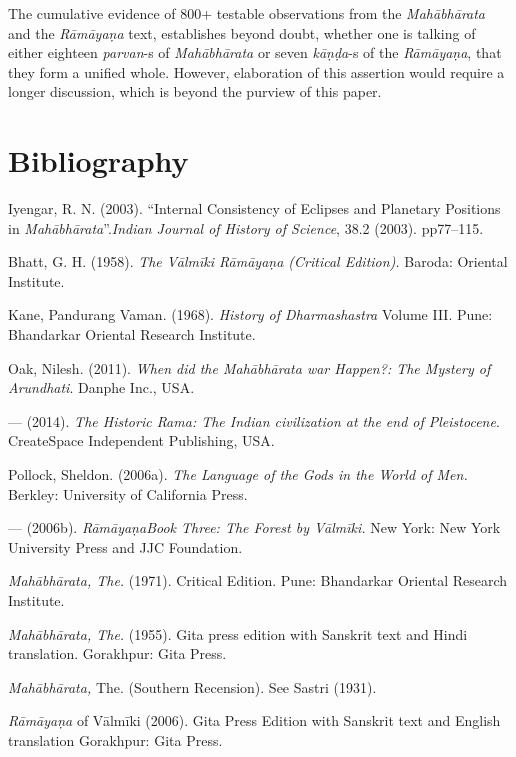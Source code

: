 The cumulative evidence of 800+ testable observations from the \textit{Mahābhārata} and the \textit{Rāmāyaṇa} text, establishes beyond doubt, whether one is talking of either eighteen \textit{parvan}-s of \textit{Mahābhārata} or seven \textit{kāṇḍa}-s of the \textit{Rāmāyaṇa}, that they form a unified whole. However, elaboration of this assertion would require a longer discussion, which is beyond the purview of this paper.


\section*{Bibliography}

\begin{thebibliography}{99}
\itemsep=1pt
 Iyengar, R. N. (2003). “Internal Consistency of Eclipses and Planetary Positions in \textit{Mahābhārata}”.\textit{Indian Journal of History of Science}, 38.2 (2003). pp77--115.

  Bhatt, G. H. (1958). \textit{The Vālmīki Rāmāyaṇa (Critical Edition).} Baroda: Oriental Institute.

  Kane, Pandurang Vaman. (1968). \textit{History of Dharmashastra} Volume III. Pune: Bhandarkar Oriental Research Institute.

  Oak, Nilesh. (2011). \textit{When did the Mahābhārata war Happen?: The Mystery of Arundhati}. Danphe Inc., USA.

  — (2014). \textit{The Historic Rama: The Indian civilization at the end of Pleistocene}. CreateSpace Independent Publishing, USA.

  Pollock, Sheldon. (2006a). \textit{The Language of the Gods in the World of Men.} Berkley: University of California Press.

  — (2006b). \textit{Rāmāyaṇa}\textit{Book Three: The Forest by Vālmīki.} New York: New York University Press and JJC Foundation.

  \textit{Mahābhārata, The.} (1971). Critical Edition. Pune: Bhandarkar Oriental Research Institute.

  \textit{Mahābhārata, The.} (1955). Gita press edition with Sanskrit text and Hindi translation. Gorakhpur: Gita Press.

  \textit{Mahābhārata,} The. (Southern Recension). See Sastri (1931).

  \textit{Rāmāyaṇa} of Vālmīki (2006). Gita Press Edition with Sanskrit text and English translation Gorakhpur: Gita Press.


\end{thebibliography}
